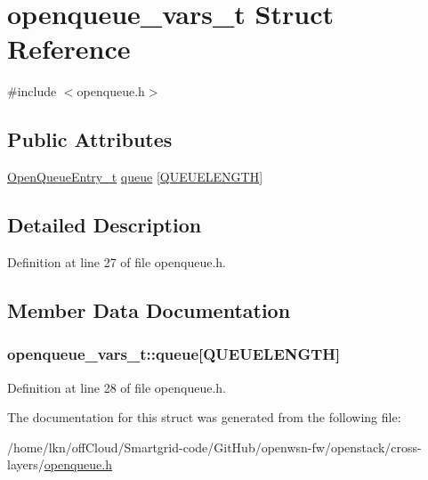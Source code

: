 \hypertarget{structopenqueue__vars__t}{}\section{openqueue\+\_\+vars\+\_\+t Struct Reference}
\label{structopenqueue__vars__t}


{\ttfamily \#include $<$openqueue.\+h$>$}

\subsection*{Public Attributes}
\begin{DoxyCompactItemize}
\item 
\hyperlink{struct_open_queue_entry__t}{Open\+Queue\+Entry\+\_\+t} \hyperlink{structopenqueue__vars__t_aa9384066b1463aba6e61dd3bb799d457}{queue} \mbox{[}\hyperlink{group___open_queue_gaf56b9dc58ae650ca79c068105b84bb79}{Q\+U\+E\+U\+E\+L\+E\+N\+G\+TH}\mbox{]}
\end{DoxyCompactItemize}


\subsection{Detailed Description}


Definition at line 27 of file openqueue.\+h.



\subsection{Member Data Documentation}
\subsubsection[{\texorpdfstring{queue}{queue}}]{ openqueue\+\_\+vars\+\_\+t\+::queue\mbox{[}{\bf Q\+U\+E\+U\+E\+L\+E\+N\+G\+TH}\mbox{]}}\hypertarget{structopenqueue__vars__t_aa9384066b1463aba6e61dd3bb799d457}{}\label{structopenqueue__vars__t_aa9384066b1463aba6e61dd3bb799d457}


Definition at line 28 of file openqueue.\+h.



The documentation for this struct was generated from the following file\+:\begin{DoxyCompactItemize}
\item 
/home/lkn/off\+Cloud/\+Smartgrid-\/code/\+Git\+Hub/openwsn-\/fw/openstack/cross-\/layers/\hyperlink{openqueue_8h}{openqueue.\+h}\end{DoxyCompactItemize}
